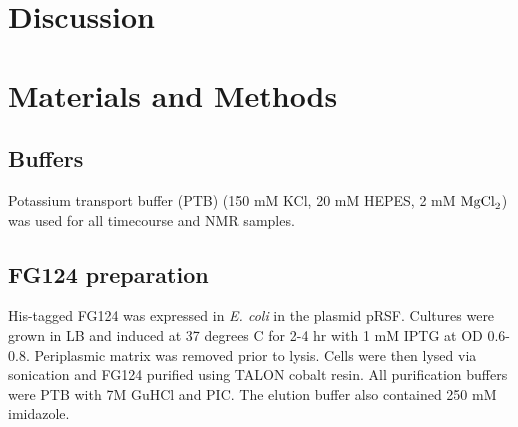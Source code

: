 \section{Discussion}

\section{Materials and Methods}
\subsection{Buffers} Potassium transport buffer (PTB) (150 mM KCl, 20 mM HEPES, 2 mM $\mathrm{MgCl}_2$) was used for all timecourse and NMR samples.
\subsection{FG124 preparation} His-tagged FG124 was expressed in \emph{E. coli} in the plasmid pRSF.  Cultures were grown in LB and  induced at 37 degrees C for 2-4 hr with 1 mM IPTG at OD 0.6-0.8.  Periplasmic matrix was removed prior to lysis.  Cells were then lysed via sonication and FG124 purified using TALON cobalt resin.  All purification buffers were PTB with 7M GuHCl and PIC.  The elution buffer also contained 250 mM imidazole.
